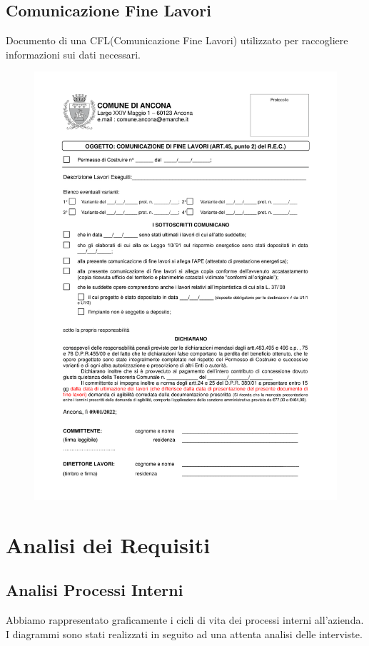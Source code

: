 \documentclass{elegantbook}
\begin{document}
	\subsection{Comunicazione Fine Lavori}
	Documento di una CFL(Comunicazione Fine Lavori) utilizzato per raccogliere informazioni sui dati necessari.
		\begin{figure}[H]
			\centering
			\includegraphics[scale=0.8]{../Img/Documents/CFL/CFL.png}
		\end{figure}
	\newpage	
	\section{Analisi dei Requisiti}
	\subsection{Analisi Processi Interni}
	Abbiamo rappresentato graficamente i cicli di vita dei processi interni all'azienda. I diagrammi sono stati realizzati in seguito ad una attenta analisi delle interviste.
\end{document}
